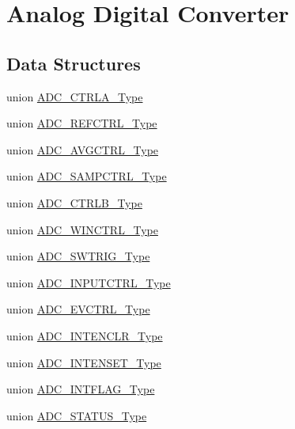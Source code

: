 \hypertarget{group___s_a_m_d21___a_d_c}{}\section{Analog Digital Converter}
\label{group___s_a_m_d21___a_d_c}
\subsection*{Data Structures}
\begin{DoxyCompactItemize}
\item 
union \mbox{\hyperlink{union_a_d_c___c_t_r_l_a___type}{A\+D\+C\+\_\+\+C\+T\+R\+L\+A\+\_\+\+Type}}
\item 
union \mbox{\hyperlink{union_a_d_c___r_e_f_c_t_r_l___type}{A\+D\+C\+\_\+\+R\+E\+F\+C\+T\+R\+L\+\_\+\+Type}}
\item 
union \mbox{\hyperlink{union_a_d_c___a_v_g_c_t_r_l___type}{A\+D\+C\+\_\+\+A\+V\+G\+C\+T\+R\+L\+\_\+\+Type}}
\item 
union \mbox{\hyperlink{union_a_d_c___s_a_m_p_c_t_r_l___type}{A\+D\+C\+\_\+\+S\+A\+M\+P\+C\+T\+R\+L\+\_\+\+Type}}
\item 
union \mbox{\hyperlink{union_a_d_c___c_t_r_l_b___type}{A\+D\+C\+\_\+\+C\+T\+R\+L\+B\+\_\+\+Type}}
\item 
union \mbox{\hyperlink{union_a_d_c___w_i_n_c_t_r_l___type}{A\+D\+C\+\_\+\+W\+I\+N\+C\+T\+R\+L\+\_\+\+Type}}
\item 
union \mbox{\hyperlink{union_a_d_c___s_w_t_r_i_g___type}{A\+D\+C\+\_\+\+S\+W\+T\+R\+I\+G\+\_\+\+Type}}
\item 
union \mbox{\hyperlink{union_a_d_c___i_n_p_u_t_c_t_r_l___type}{A\+D\+C\+\_\+\+I\+N\+P\+U\+T\+C\+T\+R\+L\+\_\+\+Type}}
\item 
union \mbox{\hyperlink{union_a_d_c___e_v_c_t_r_l___type}{A\+D\+C\+\_\+\+E\+V\+C\+T\+R\+L\+\_\+\+Type}}
\item 
union \mbox{\hyperlink{union_a_d_c___i_n_t_e_n_c_l_r___type}{A\+D\+C\+\_\+\+I\+N\+T\+E\+N\+C\+L\+R\+\_\+\+Type}}
\item 
union \mbox{\hyperlink{union_a_d_c___i_n_t_e_n_s_e_t___type}{A\+D\+C\+\_\+\+I\+N\+T\+E\+N\+S\+E\+T\+\_\+\+Type}}
\item 
union \mbox{\hyperlink{union_a_d_c___i_n_t_f_l_a_g___type}{A\+D\+C\+\_\+\+I\+N\+T\+F\+L\+A\+G\+\_\+\+Type}}
\item 
union \mbox{\hyperlink{union_a_d_c___s_t_a_t_u_s___type}{A\+D\+C\+\_\+\+S\+T\+A\+T\+U\+S\+\_\+\+Type}}
\item 

\end{DoxyCompactItemize}
